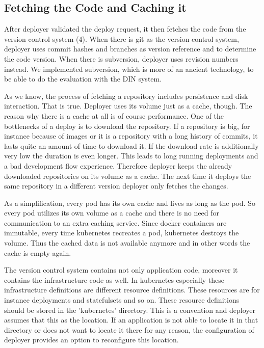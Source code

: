 \subsection{Fetching the Code and Caching it}

After deployer validated the deploy request, it then fetches the code from the version
control system (4). When there is git as the version control system, deployer uses commit
hashes and branches as version reference and to determine the code version. When there is
subversion, deployer uses revision numbers instead. We implemented subversion, which is
more of an ancient technology, to be able to do the evaluation with the DIN system.

As we know, the process of fetching a repository includes persistence and disk
interaction. That is true. Deployer uses its volume just as a cache, though. The reason
why there is a cache at all is of course performance. One of the bottlenecks of a deploy
is to download the repository. If a repository is big, for instance because of images or
it is a repository with a long history of commits, it lasts quite an amount of time to
download it. If the download rate is additionally very low the duration is even
longer. This leads to long running deployments and a bad development flow
experience. Therefore deployer keeps the already downloaded repositories on its volume as
a cache. The next time it deploys the same repository in a different version deployer only
fetches the changes.

As a simplification, every pod has its own cache and lives as long as the pod. So every
pod utilizes its own volume as a cache and there is no need for communication to an extra
caching service. Since docker containers are immutable, every time kubernetes recreates a
pod, kubernetes destroys the volume. Thus the cached data is not available anymore and in
other words the cache is empty again.

The version control system contains not only application code, moreover it contains the
infrastructure code as well. In kubernetes especially these infrastructure definitions are
different resource definitions. These resources are for instance deployments and
statefulsets and so on. These resource definitions should be stored in the 'kubernetes'
directory. This is a convention and deployer assumes that this as the location. If an
application is not able to locate it in that directory or does not want to locate it there
for any reason, the configuration of deployer provides an option to reconfigure this
location.

